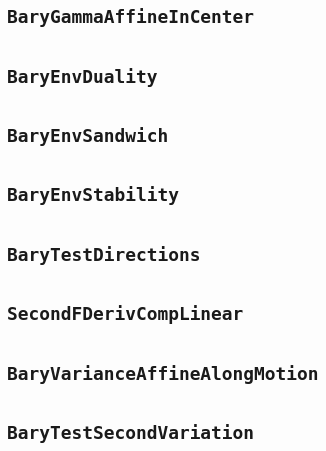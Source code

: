 \documentclass[11pt]{amsart}
\theoremstyle{definition}
\begin{document}
\subsection{\texorpdfstring{\texttt{BaryGammaAffineInCenter}}{BaryGammaAffineInCenter}}\label{node:BaryGammaAffineInCenter}


\subsection{\texorpdfstring{\texttt{BaryEnvDuality}}{BaryEnvDuality}}\label{node:BaryEnvDuality}


\subsection{\texorpdfstring{\texttt{BaryEnvSandwich}}{BaryEnvSandwich}}\label{node:BaryEnvSandwich}


\subsection{\texorpdfstring{\texttt{BaryEnvStability}}{BaryEnvStability}}\label{node:BaryEnvStability}


\subsection{\texorpdfstring{\texttt{BaryTestDirections}}{BaryTestDirections}}\label{node:BaryTestDirections}


\subsection{\texorpdfstring{\texttt{SecondFDerivCompLinear}}{SecondFDerivCompLinear}}\label{node:SecondFDerivCompLinear}


\subsection{\texorpdfstring{\texttt{BaryVarianceAffineAlongMotion}}{BaryVarianceAffineAlongMotion}}\label{node:BaryVarianceAffineAlongMotion}


\subsection{\texorpdfstring{\texttt{BaryTestSecondVariation}}{BaryTestSecondVariation}}\label{node:BaryTestSecondVariation}

\end{document}
